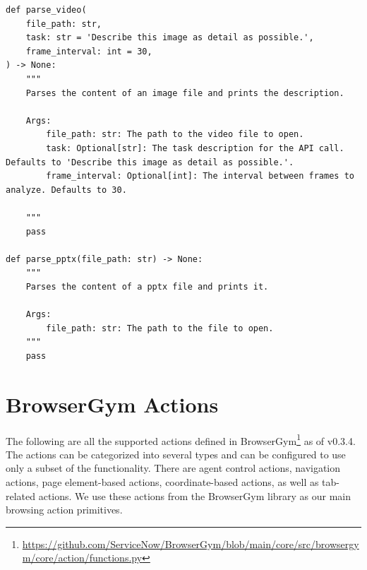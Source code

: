 \begin{verbatim}
def parse_video(
    file_path: str,
    task: str = 'Describe this image as detail as possible.',
    frame_interval: int = 30,
) -> None:
    """
    Parses the content of an image file and prints the description.

    Args:
        file_path: str: The path to the video file to open.
        task: Optional[str]: The task description for the API call. Defaults to 'Describe this image as detail as possible.'.
        frame_interval: Optional[int]: The interval between frames to analyze. Defaults to 30.

    """
    pass

def parse_pptx(file_path: str) -> None:
    """
    Parses the content of a pptx file and prints it.

    Args:
        file_path: str: The path to the file to open.
    """
    pass
\end{verbatim}


\section{BrowserGym Actions}
\label{sec:browsergym-actions}
The following are all the supported actions defined in BrowserGym\footnote{\url{https://github.com/ServiceNow/BrowserGym/blob/main/core/src/browsergym/core/action/functions.py}} as of v0.3.4.
The actions can be categorized into several types and can be configured to use only a subset of the functionality.
There are agent control actions, navigation actions, page element-based actions, coordinate-based actions, as well as tab-related actions.
We use these actions from the BrowserGym library as our main browsing action primitives.

